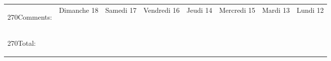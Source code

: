\documentclass[11pt,a4paper,landscape]{article} %
\newlength{\daycellwidth}
\newlength{\countcellwidth}
\newlength{\daycellheight}
\newcommand{\textindaycell}[1]{%
\hspace{0.9\daycellheight}\begin{turn}{270}#1\end{turn}%
}
\begin{document}
\begin{tabular}{|p{\daycellheight}|*{7}{p{\daycellheight}|}} \hline
\multirow{2}{*}{\textindaycell{Comments:}}
 & Dimanche 18 & Samedi 17 & Vendredi 16 & Jeudi 14 & Mercredi 15 & Mardi 13 & Lundi 12 \\ \cline{2-8}
 & \vspace{\daycellwidth}\phantom{c}   &  &  &  &  &  &  \\ \hline \hline
\textindaycell{Total:} & \vspace{\countcellwidth}\phantom{c} &  &  &  &  &  &  \\ \hline
\end{tabular}
\end{document}
